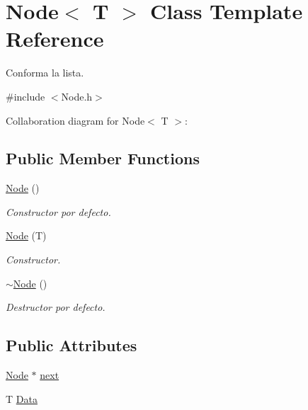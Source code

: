 \hypertarget{classNode}{}\section{Node$<$ T $>$ Class Template Reference}
\label{classNode}


Conforma la lista.  




{\ttfamily \#include $<$Node.\+h$>$}



Collaboration diagram for Node$<$ T $>$\+:
\subsection*{Public Member Functions}
\begin{DoxyCompactItemize}
\item 
\mbox{\label{classNode_a0ac1d44cfe588be564acf25485029bd8}} 
\hyperlink{classNode_a0ac1d44cfe588be564acf25485029bd8}{Node} ()
\begin{DoxyCompactList}\small\item\em Constructor por defecto. \end{DoxyCompactList}\item 
\hyperlink{classNode_ab2f2bd0551fbce8ee80741462c9c86ef}{Node} (T)
\begin{DoxyCompactList}\small\item\em Constructor. \end{DoxyCompactList}\item 
\mbox{\label{classNode_ae923d0417581dd19784d55b901f0f7f0}} 
\hyperlink{classNode_ae923d0417581dd19784d55b901f0f7f0}{$\sim$\+Node} ()
\begin{DoxyCompactList}\small\item\em Destructor por defecto. \end{DoxyCompactList}\end{DoxyCompactItemize}
\subsection*{Public Attributes}
\begin{DoxyCompactItemize}
\item 
\hyperlink{classNode}{Node} $\ast$ \hyperlink{classNode_ac1c0563946c59c36bddde431b4adb00b}{next}
\item 
T \hyperlink{classNode_a02a7efb2ba05a45fdfb2d5dc3519926d}{Data}
\end{DoxyCompactItemize}


